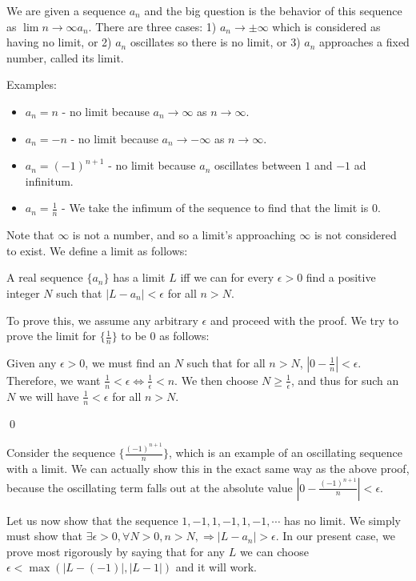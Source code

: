 \documentclass{report}
\begin{document}
We are given a sequence $a_n$ and the big question is the behavior of this sequence as $\displaystyle\lim\limits{n \to \infty} a_n$. There are three cases: 1) $a_n \to \pm \infty$ which is considered as having no limit, or 2) $a_n$ oscillates so there is no limit, or 3) $a_n$ approaches a fixed number, called its limit.

Examples:

\begin{itemize}
\item $a_n = n$ - no limit because $a_n \to \infty$ as $n \to \infty$.
\item $a_n = -n$ - no limit because $a_n \to -\infty$ as $n \to \infty$.
\item $a_n = (-1)^{n+1}$ - no limit because $a_n$ oscillates between $1$ and $-1$ ad infinitum. 
\item $a_n = \frac{1}{n}$ - We take the infimum of the sequence to find that the limit is $0$. 
\end{itemize}

Note that $\infty$ is not a number, and so a limit's approaching $\infty$ is not considered to exist. We define a limit as follows:

\begin{center}
A real sequence $\{a_n\}$ has a limit $L$ iff we can for every $\epsilon > 0$ find a positive integer $N$ such that $|L - a_n| < \epsilon$ for all $n > N$. 
\end{center}

To prove this, we assume any arbitrary $\epsilon$ and proceed with the proof. We try to prove the limit for $\{\frac{1}{n}\}$ to be $0$ as follows:

Given any $\epsilon>0$, we must find an $N$ such that for all $n>N$, $|0 - \frac{1}{n}| < \epsilon$. Therefore, we want $\frac{1}{n} < \epsilon \Leftrightarrow \frac{1}{\epsilon} < n$. We then choose $N \geq \frac{1}{\epsilon}$, and thus for such an $N$ we will have $\frac{1}{n} < \epsilon$ for all $n > N$.

\qed

Consider the sequence $\{\frac{(-1)^{n+1}}{n}\}$, which is an example of an oscillating sequence with a limit. We can actually show this in the exact same way as the above proof, because the oscillating term falls out at the absolute value $|0 - \frac{(-1)^{n+1}}{n}| < \epsilon$.

Let us now show that the sequence $1,-1,1,-1,1,-1, \cdots$ has no limit. We simply must show that $\exists \epsilon > 0, \forall N > 0, n > N, \Rightarrow |L - a_n| > \epsilon$. 
In our present case, we prove most rigorously by saying that for any $L$ we can choose $\epsilon < \max(|L - (-1)|, |L - 1|)$ and it will work.
\end{document}
